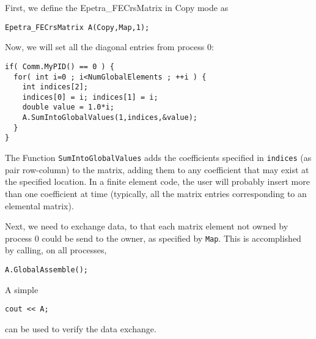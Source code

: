 First, we define the Epetra\_FECrsMatrix in Copy mode as
\begin{verbatim}
Epetra_FECrsMatrix A(Copy,Map,1);
\end{verbatim}
Now, we will set all the diagonal entries from process 0:
\begin{verbatim}
if( Comm.MyPID() == 0 ) {
  for( int i=0 ; i<NumGlobalElements ; ++i ) {
    int indices[2];
    indices[0] = i; indices[1] = i;
    double value = 1.0*i;
    A.SumIntoGlobalValues(1,indices,&value);
  }
}
\end{verbatim}
The Function \verb!SumIntoGlobalValues! adds the coefficients specified
in \verb!indices! (as pair row-column) to the matrix, adding them to any
coefficient that may exist at the specified location. In a finite
element code, the user will probably insert more than one coefficient
at time (typically, all the matrix entries corresponding to an elemental
matrix).

Next, we need to exchange data, to that each matrix element not owned by
process 0 could be send to the owner, as specified by \verb!Map!. This
is accomplished by calling, on all processes,
\begin{verbatim}
A.GlobalAssemble();
\end{verbatim}
A simple 
\begin{verbatim}
cout << A;
\end{verbatim}
can be used to verify the data exchange.




